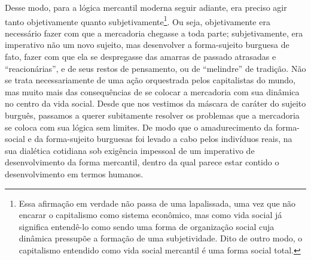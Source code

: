 Desse modo, para a lógica mercantil moderna seguir adiante, era preciso
agir tanto objetivamente quanto subjetivamente\footnote{Essa afirmação
  em verdade não passa de uma lapalissada, uma vez que não encarar o
  capitalismo como sistema econômico, mas como vida social já significa
  entendê-lo como sendo uma forma de organização social cuja dinâmica
  pressupõe a formação de uma subjetividade. Dito de outro modo, o
  capitalismo entendido como vida social mercantil é uma forma social
  total.}. Ou seja, objetivamente era necessário fazer com que a
mercadoria chegasse a toda parte; subjetivamente, era imperativo não um
novo sujeito, mas desenvolver a forma-sujeito burguesa de fato, fazer
com que ela se despregasse das amarras de passado atrasadas e
``reacionárias'', e de seus restos de pensamento, ou de ``melindre'' de
tradição. Não se trata necessariamente de uma ação orquestrada pelos
capitalistas do mundo, mas muito mais das consequências de se colocar a
mercadoria com sua dinâmica no centro da vida social. Desde que nos
vestimos da máscara de caráter do sujeito burguês, passamos a querer
subitamente resolver os problemas que a mercadoria se coloca com sua
lógica sem limites. De modo que o amadurecimento da forma-social e da
forma-sujeito burguesas foi levado a cabo pelos indivíduos reais, na sua
dialética cotidiana sob exigência impessoal de um imperativo de
desenvolvimento da forma mercantil, dentro da qual parece estar contido
o desenvolvimento em termos humanos.

